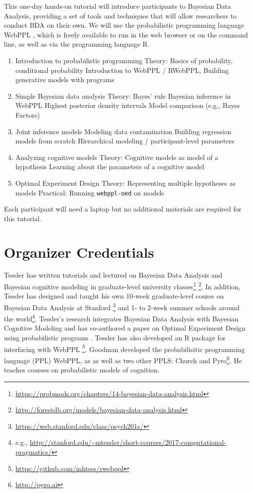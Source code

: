 \documentclass[10pt,letterpaper]{article}
\providecommand{\tightlist}{%
  \setlength{\itemsep}{0pt}\setlength{\parskip}{0pt}}
\begin{document}
This one-day hands-on tutorial will introduce participants to Bayesian Data Analysis, providing a set of tools and techniques that will allow researchers to conduct BDA on their own. 
We will use the probabilistic programming language WebPPL \cite{dippl}, which is freely available to run in the web browser or on the command line, as well as via the programming language R. 

\begin{enumerate}
\tightlist
\item Introduction to probabilistic programming
	\subitem Theory: Basics of probability, conditional probability
	\subitem Introduction to WebPPL / RWebPPL, 
	\subitem Building generative models with programs
\item Simple Bayesian data analysis
	\subitem Theory: Bayes' rule
	\subitem Bayesian inference in WebPPL
	\subitem Highest posterior density intervals
	\subitem Model comparison (e.g., Bayes Factors)
\item Joint inference models
	\subitem Modeling data contamination
	\subitem Building regression models from scratch 
	\subitem Hierarchical modeling  / participant-level parameters
\item Analyzing cognitive models
	\subitem Theory: Cognitive models as model of a hypothesis
	\subitem Learning about the parameters of a cognitive model
\item Optimal Experiment Design
	\subitem Theory: Representing multiple hypotheses as models 
	\subitem Practical: Running \texttt{webppl-oed} on models
\end{enumerate}

Each participant will need a laptop but no additional materials are required for this tutorial. 

\section{Organizer Credentials}

Tessler has written tutorials and lectured on Bayesian Data Analysis and Bayesian cognitive modeling in graduate-level university classes\footnote{\url{https://probmods.org/chapters/14-bayesian-data-analysis.html}}
\footnote{\url{http://forestdb.org/models/bayesian-data-analysis.html}}.
In addition, Tessler has designed and taught his own 10-week graduate-level course on Bayesian Data Analysis at Stanford \footnote{
\url{https://web.stanford.edu/class/psych201s/}
} and 1- to 2-week summer schools around the world\footnote{
e.g., \url{http://stanford.edu/~mtessler/short-courses/2017-computational-pragmatics/}}.
Tessler's research integrates Bayesian Data Analysis with Bayesian Cognitive Modeling and has co-authored a paper on Optimal Experiment Design using probabilistic programs \cite{OuyangTLG16}.  
Tessler has also developed an R package for interfacing with WebPPL \footnote{\url{https://github.com/mhtess/rwebppl}}.
Goodman developed the probabilisitic programming language (PPL) WebPPL, as as well as two other PPLS: Church \cite{church} and Pyro\footnote{\url{http://pyro.ai}}.
He teaches courses on probabilistic models of cognition.




\setlength{\bibleftmargin}{.125in}
\setlength{\bibindent}{-\bibleftmargin}


\end{document}
